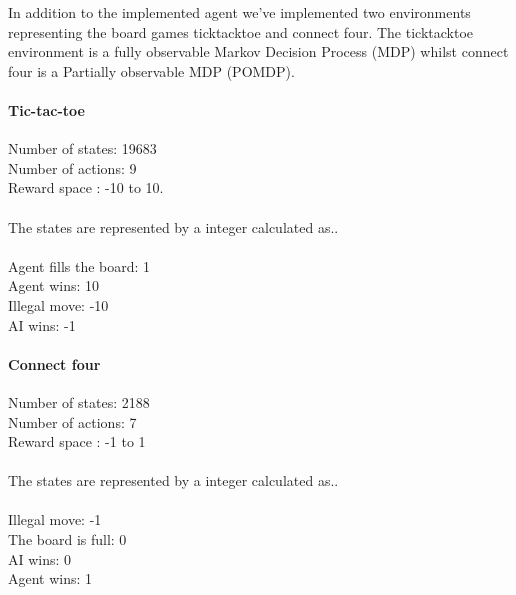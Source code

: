 In addition to the implemented agent we've implemented two environments representing the board games ticktacktoe and connect four. The ticktacktoe environment is a fully observable Markov Decision Process (MDP) whilst connect four is a Partially observable MDP (POMDP).
\paragraph{Tic-tac-toe}
Number of states: 19683 \\
Number of actions: 9\\
Reward space : -10 to 10.\\
\\
The states are represented by a integer calculated as..\\
\\
Agent fills the board: 1\\
Agent wins: 10\\
Illegal move: -10\\
AI wins: -1
\paragraph{Connect four}
Number of states: 2188 \\
Number of actions: 7\\
Reward space : -1 to 1\\
\\
The states are represented by a integer calculated as..\\
\\
Illegal move: -1\\
The board is full:  0\\
AI wins: 0\\
Agent wins: 1
